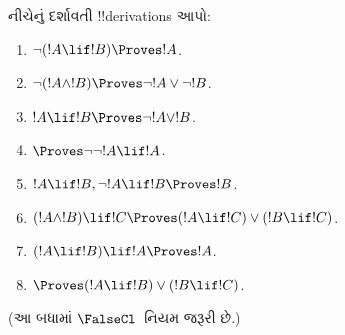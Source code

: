 \documentclass[../../../include/open-logic-section]{subfiles}
\begin{document}
\begin{prob}
નીચેનું દર્શાવતી !!{derivation}s આપો:
\begin{enumerate}
\item $\lnot(!A \lif !B) \Proves !A$.
\item $\lnot(!A \land !B) \Proves \lnot !A \lor \lnot !B$.
\item $!A \lif !B \Proves \lnot !A \lor !B$.
\item $\Proves \lnot \lnot !A \lif !A$.
\item $!A \lif !B, \lnot !A \lif !B \Proves !B$.
\item $(!A \land !B) \lif !C \Proves (!A \lif !C) \lor (!B \lif !C)$.
\item $(!A \lif !B) \lif !A \Proves !A$.
\item $\Proves (!A \lif !B) \lor (!B \lif !C)$.
\end{enumerate}
(આ બધામાં $\FalseCl$~નિયમ જરૂરી છે.)
\end{prob}
\end{document}
